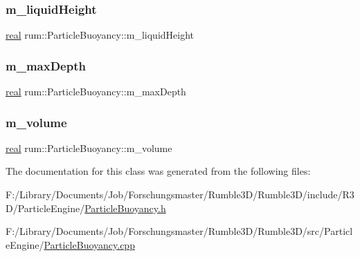\mbox{\label{classrum_1_1_particle_buoyancy_a220309bad493fc0d090bd3e91d9f4acb}} 
\subsubsection{\texorpdfstring{m\+\_\+liquid\+Height}{m\_liquidHeight}}
{\footnotesize\ttfamily \hyperlink{namespacerum_a7e8cca23573d5eaead0f138cbaa4862c}{real} rum\+::\+Particle\+Buoyancy\+::m\+\_\+liquid\+Height\hspace{0.3cm}{\ttfamily [protected]}}

\mbox{\label{classrum_1_1_particle_buoyancy_af29f25245a785fc1bceafeac08728370}} 
\subsubsection{\texorpdfstring{m\+\_\+max\+Depth}{m\_maxDepth}}
{\footnotesize\ttfamily \hyperlink{namespacerum_a7e8cca23573d5eaead0f138cbaa4862c}{real} rum\+::\+Particle\+Buoyancy\+::m\+\_\+max\+Depth\hspace{0.3cm}{\ttfamily [protected]}}

\mbox{\label{classrum_1_1_particle_buoyancy_acb0a75c58de8ddede0b4be9939917c32}} 
\subsubsection{\texorpdfstring{m\+\_\+volume}{m\_volume}}
{\footnotesize\ttfamily \hyperlink{namespacerum_a7e8cca23573d5eaead0f138cbaa4862c}{real} rum\+::\+Particle\+Buoyancy\+::m\+\_\+volume\hspace{0.3cm}{\ttfamily [protected]}}



The documentation for this class was generated from the following files\+:\begin{DoxyCompactItemize}
\item 
F\+:/\+Library/\+Documents/\+Job/\+Forschungsmaster/\+Rumble3\+D/\+Rumble3\+D/include/\+R3\+D/\+Particle\+Engine/\hyperlink{_particle_buoyancy_8h}{Particle\+Buoyancy.\+h}\item 
F\+:/\+Library/\+Documents/\+Job/\+Forschungsmaster/\+Rumble3\+D/\+Rumble3\+D/src/\+Particle\+Engine/\hyperlink{_particle_buoyancy_8cpp}{Particle\+Buoyancy.\+cpp}\end{DoxyCompactItemize}
